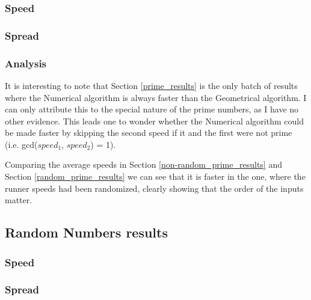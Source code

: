 \subsubsection*{Speed}
\FloatBarrier



\FloatBarrier
\subsubsection*{Spread}
\FloatBarrier



\FloatBarrier
\subsubsection*{Analysis}
\label{result_prime}
It is interesting to note that Section \ref{prime_results} is the only batch of results where the Numerical algorithm is always faster than the Geometrical algorithm. I can only attribute this to the special nature of the prime numbers, as I have no other evidence. This leads one to wonder whether the Numerical algorithm could be made faster by skipping the second speed if it and the first were not prime (i.e. gcd($speed_1$, $speed_2$) = 1).

Comparing the average speeds in Section \ref{non-random_prime_results} and Section \ref{random_prime_results} we can see that it is faster in the one, where the runner speeds had been randomized, clearly showing that the order of the inputs matter.

\subsection{Random Numbers results}

\subsubsection*{Speed}
\FloatBarrier
\label{random_results}
\label{sorted_random_results}

\label{non-sorted_random_results}

\label{non-sorted_random_results}

\FloatBarrier
\subsubsection*{Spread}
\FloatBarrier



\FloatBarrier
